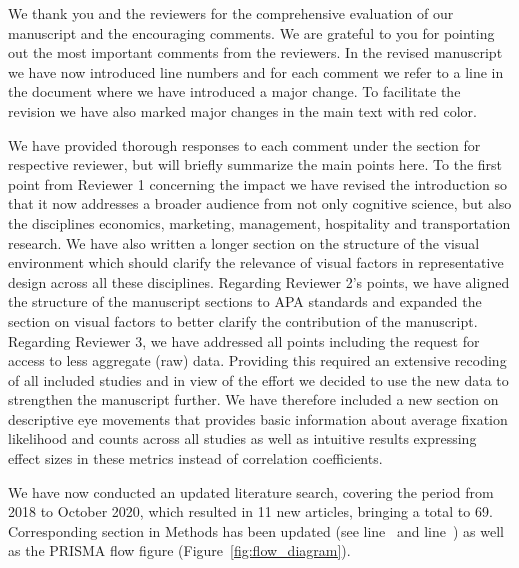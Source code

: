 We thank you and the reviewers for the comprehensive evaluation of our manuscript and the encouraging comments. We are grateful to you for pointing out the most important comments from the reviewers. In the revised manuscript we have now introduced line numbers and for each comment we refer to a line in the document where we have introduced a major change. To facilitate the revision we have also marked major changes in the main text with red color. 

We have provided thorough responses to each comment under the section for respective reviewer, but will briefly summarize the main points here. To the first point from Reviewer 1 concerning the impact we have revised the introduction so that it now addresses a broader audience from not only cognitive science, but also the disciplines economics, marketing, management, hospitality and transportation research. We have also written a longer section on the structure of the visual environment which should clarify the relevance of visual factors in representative design across all these disciplines. Regarding Reviewer 2's points, we have aligned the structure of the manuscript sections to APA standards and expanded the section on visual factors to better clarify the contribution of the manuscript. Regarding Reviewer 3, we have addressed all points including the request for access to less aggregate (raw) data. Providing this required an extensive recoding of all included studies and in view of the effort we decided to use the new data to strengthen the manuscript further. We have therefore included a new section on descriptive eye movements that provides basic information about average fixation likelihood and counts across all studies as well as intuitive results expressing effect sizes in these metrics instead of correlation coefficients.    

    
We have now conducted an updated literature search, covering the period from 2018 to October 2020, which resulted in 11 new articles, bringing a total to 69. Corresponding section in Methods has been updated (see line~ and line~) as well as the PRISMA flow figure (Figure~\ref{fig:flow_diagram}).
    
    

